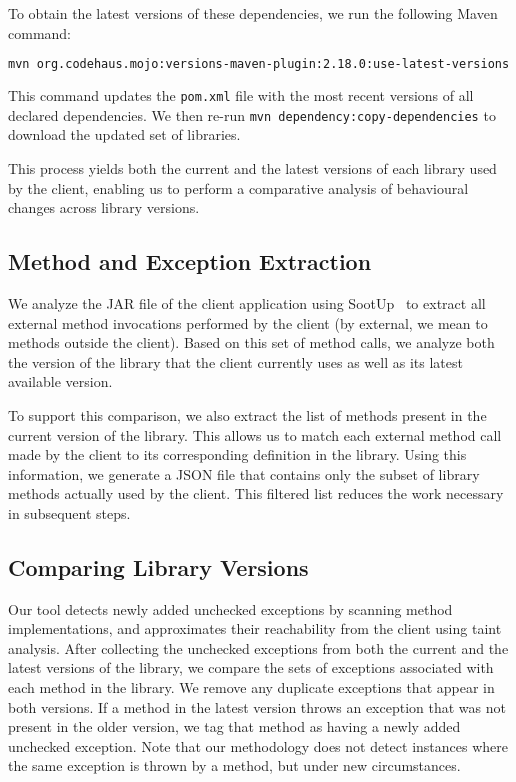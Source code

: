 To obtain the latest versions of these dependencies, we run the following Maven command:
\begin{lstlisting}[language=bash, breaklines=true, basicstyle=\ttfamily\small]
mvn org.codehaus.mojo:versions-maven-plugin:2.18.0:use-latest-versions
\end{lstlisting}
This command updates the \texttt{pom.xml} file with the most recent versions of all declared dependencies. We then re-run \texttt{mvn dependency:copy-dependencies} to download the updated set of libraries.

This process yields both the current and the latest versions of each library used by the client, enabling us to perform a comparative analysis of behavioural changes across library versions.

\subsection{Method and Exception Extraction}

We analyze the JAR file of the client application using SootUp~\cite{Karakaya24:_sootup} to extract all external method invocations performed by the client (by external, we mean to methods outside the client). Based on this set of method calls, we analyze both the version of the library that the client currently uses as well as its latest available version.

To support this comparison, we also extract the list of methods present in the current version of the library. This allows us to match each external method call made by the client to its corresponding definition in the library. Using this information, we generate a JSON file that contains only the subset of library methods actually used by the client. This filtered list reduces the work necessary in subsequent steps.

\subsection{Comparing Library Versions}

Our tool detects newly added unchecked exceptions by scanning method implementations, and approximates their reachability from the client using taint analysis. After collecting the unchecked exceptions from both the current and the latest versions of the library, we compare the sets of exceptions associated with each method in the library. We remove any duplicate exceptions that appear in both versions. If a method in the latest version throws an exception that was not present in the older version, we tag that method as having a newly added unchecked exception. Note that our methodology does not detect instances where the same exception is thrown by a method, but under new circumstances.

